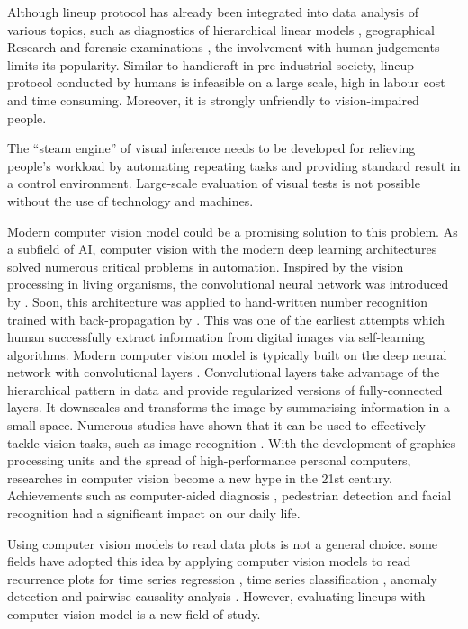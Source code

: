 \documentclass{monashthesis}
\theoremstyle{definition}
\theoremstyle{definition}
\theoremstyle{definition}
\theoremstyle{definition}
\theoremstyle{remark}
\begin{document}
Although lineup protocol has already been integrated into data analysis of various topics, such as diagnostics of hierarchical linear models \autocite{loy_diagnostic_2013}, geographical Research \autocite{widen_graphical_2016} and forensic examinations \autocite{krishnan_hierarchical_2021}, the involvement with human judgements limits its popularity. Similar to handicraft in pre-industrial society, lineup protocol conducted by humans is infeasible on a large scale, high in labour cost and time consuming. Moreover, it is strongly unfriendly to vision-impaired people.

The ``steam engine'' of visual inference needs to be developed for relieving people's workload by automating repeating tasks and providing standard result in a control environment. Large-scale evaluation of visual tests is not possible without the use of technology and machines.

Modern computer vision model could be a promising solution to this problem. As a subfield of AI, computer vision with the modern deep learning architectures solved numerous critical problems in automation. Inspired by the vision processing in living organisms, the convolutional neural network was introduced by \textcite{fukushima_neocognitron_1982}. Soon, this architecture was applied to hand-written number recognition trained with back-propagation by \textcite{lecun_backpropagation_1989}. This was one of the earliest attempts which human successfully extract information from digital images via self-learning algorithms. Modern computer vision model is typically built on the deep neural network with convolutional layers \autocite{fukushima_neocognitron_1982}. Convolutional layers take advantage of the hierarchical pattern in data and provide regularized versions of fully-connected layers. It downscales and transforms the image by summarising information in a small space. Numerous studies have shown that it can be used to effectively tackle vision tasks, such as image recognition \autocite{rawat_deep_2017}. With the development of graphics processing units and the spread of high-performance personal computers, researches in computer vision become a new hype in the 21st century. Achievements such as computer-aided diagnosis \autocite{lee_image_2015}, pedestrian detection \autocite{brunetti_computer_2018} and facial recognition \autocite{emami_facial_2012} had a significant impact on our daily life.

Using computer vision models to read data plots is not a general choice. some fields have adopted this idea by applying computer vision models to read recurrence plots for time series regression \autocite{ojeda_multivariate_2020}, time series classification \autocite{chu_automatic_2019,hailesilassie_financial_2019,hatami_classification_2018,zhang_encoding_2020}, anomaly detection \autocite{chen_convolutional_2020} and pairwise causality analysis \autocite{singh_deep_2017}. However, evaluating lineups with computer vision model is a new field of study.
\end{document}

